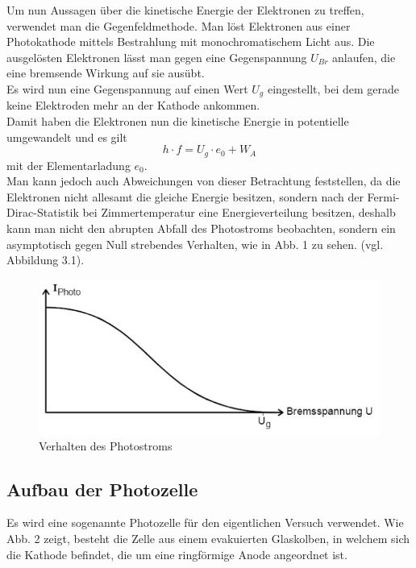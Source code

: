 Um nun Aussagen über die kinetische Energie der Elektronen zu treffen, verwendet man die Gegenfeldmethode. Man löst Elektronen aus einer Photokathode mittels Bestrahlung mit monochromatischem Licht aus. Die ausgelösten Elektronen lässt man gegen eine Gegenspannung $U_{Br}$ anlaufen, die eine bremsende Wirkung auf sie ausübt.\\
Es wird nun eine Gegenspannung auf einen Wert $U_g$ eingestellt, bei dem gerade keine Elektroden mehr an der Kathode ankommen.\\
Damit haben die Elektronen nun die kinetische Energie in potentielle umgewandelt und es gilt
\begin{equation}
\label{eq:Theorie_EnergieGleichung}
h \cdot f = U_{g} \cdot e_0 + W_A
\end{equation}
mit der Elementarladung $e_0$.\\

Man kann jedoch auch Abweichungen von dieser Betrachtung feststellen, da die Elektronen nicht allesamt die gleiche Energie besitzen, sondern nach der Fermi-Dirac-Statistik bei Zimmertemperatur eine Energieverteilung besitzen, deshalb kann man nicht den abrupten Abfall des Photostroms beobachten, sondern ein asymptotisch gegen Null strebendes Verhalten, wie in Abb. 1 zu sehen. (vgl. Abbildung 3.1).
\begin{figure}[h]
	\centering
	\includegraphics[scale = 0.6,]{Grafiken/V500_Abb1.jpg}
	\caption{Verhalten des Photostroms\cite{V500}}
\end{figure}



\subsection{Aufbau der Photozelle}
Es wird eine sogenannte Photozelle für den eigentlichen Versuch verwendet. Wie Abb. 2 zeigt, besteht die Zelle aus einem evakuierten Glaskolben, in welchem sich die Kathode befindet, die um eine ringförmige Anode angeordnet ist.\\

